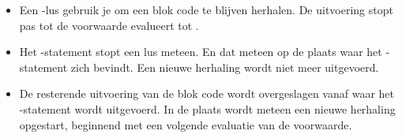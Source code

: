 \begin{itemize}
	\item
		\newline
		Een -lus gebruik je om een blok code te blijven herhalen.
		De uitvoering stopt pas tot de voorwaarde evalueert tot \false.
	\item
		\newline
		Het -statement stopt een lus meteen.
		En dat meteen op de plaats waar het -statement zich bevindt.
		Een nieuwe herhaling wordt niet meer uitgevoerd.
	\item
		\newline
		De resterende uitvoering van de blok code wordt overgeslagen vanaf waar het -statement wordt uitgevoerd.
		In de plaats wordt meteen een nieuwe herhaling opgestart,
		beginnend met een volgende evaluatie van de voorwaarde.
\end{itemize}